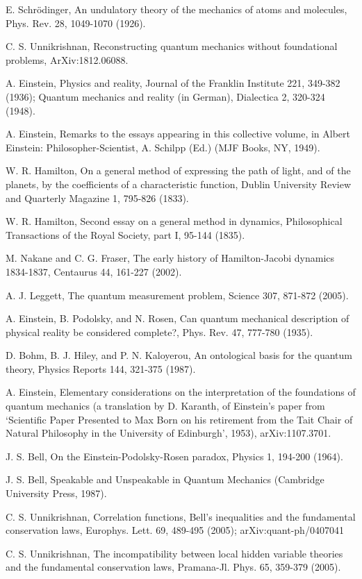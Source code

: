 \begin{thebibliography}{99}
 E. Schr\"{o}dinger, An undulatory theory of the mechanics of atoms and molecules, Phys. Rev. 28, 1049-1070 (1926).

 C. S. Unnikrishnan, Reconstructing quantum mechanics without foundational problems, ArXiv:1812.06088.

 A. Einstein, Physics and reality, Journal of the Franklin Institute 221, 349-382 (1936); Quantum mechanics and reality (in German), Dialectica 2, 320-324 (1948).

 A. Einstein, Remarks to the essays appearing in this collective volume, in Albert Einstein: Philosopher-Scientist, A. Schilpp (Ed.) (MJF Books, NY, 1949).

 W. R. Hamilton, On a general method of expressing the path of light, and of the planets, by the coefficients of a characteristic function, Dublin University Review and Quarterly Magazine 1, 795-826 (1833).

 W. R. Hamilton, Second essay on a general method in dynamics, Philosophical Transactions of the Royal Society, part I, 95-144 (1835).

 M. Nakane and C. G. Fraser, The early history of Hamilton-Jacobi dynamics 1834-1837, Centaurus 44, 161-227 (2002).

 A. J. Leggett, The quantum measurement problem, Science 307, 871-872 (2005).

 A. Einstein, B. Podolsky, and N. Rosen, Can quantum mechanical description of physical reality be considered complete?, Phys. Rev. 47, 777-780 (1935).

 D. Bohm, B. J. Hiley, and P. N. Kaloyerou, An ontological basis for the quantum theory, Physics Reports 144, 321-375 (1987).

 A. Einstein, Elementary considerations on the interpretation of the foundations of quantum mechanics (a translation by D. Karanth, of Einstein's paper from `Scientific Paper Presented to Max Born on his retirement from the Tait Chair of Natural Philosophy in the University of Edinburgh', 1953), arXiv:1107.3701.

 J. S. Bell, On the Einstein-Podolsky-Rosen paradox, Physics 1, 194-200 (1964).

 J. S. Bell, Speakable and Unspeakable in Quantum Mechanics (Cambridge University Press, 1987).

 C. S. Unnikrishnan, Correlation functions, Bell's inequalities and the fundamental conservation laws, Europhys. Lett. 69, 489-495 (2005); arXiv:quant-ph/0407041

 C. S. Unnikrishnan, The incompatibility between local hidden variable theories and the fundamental conservation laws, Pramana-Jl. Phys. 65, 359-379 (2005).

\end{thebibliography}


